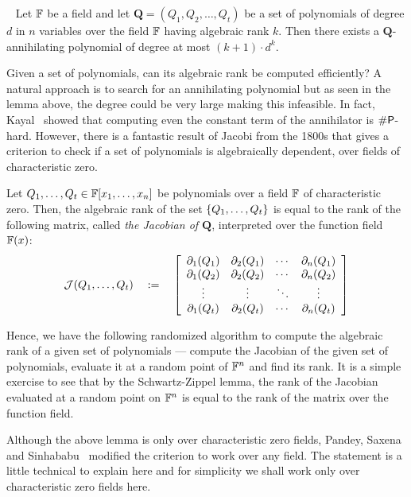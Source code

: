 \begin{lemma}~\label{lem:degree upper bound for annihilating poly}
Let $\F$ be a field and let $\mathbf{Q} = (Q_1, Q_2, \ldots, Q_t)$ be a set of polynomials of degree $d$ in $n$ variables over the field $\F$ having algebraic rank $k$. Then there exists a $\mathbf{Q}$-annihilating polynomial
of degree at most $(k+1)\cdot d^k$.
\end{lemma}  

Given a set of polynomials, can its algebraic rank be computed efficiently? A natural approach is to search for an annihilating polynomial but as seen in the lemma above, the degree could be very large making this infeasible. In fact, Kayal~\cite{Kayal09} showed that computing even the constant term of the annihilator is $\#\P$-hard. However, there is a fantastic result of Jacobi from the 1800s that gives a criterion to check if a set of polynomials is algebraically dependent, over fields of characteristic zero. 

\begin{lemma}\label{lem:jacobian-criterion}
Let $Q_1,\ldots, Q_t \in \F[x_1,\ldots, x_n]$ be polynomials over a field $\F$ of characteristic zero. Then, the algebraic rank of the set $\set{Q_1,\ldots, Q_t}$ is equal to the rank of the following matrix, called \emph{the Jacobian of $\mathbf{Q}$}, interpreted over the function field $\F(x)$:
\[
\mathcal{J}(Q_1,\ldots, Q_t) \spaced{:=} \insquare{\begin{array}{cccc}
\partial_1(Q_1) & \partial_2(Q_1) & \cdots & \partial_n(Q_1)\\
\partial_1(Q_2) & \partial_2(Q_2) & \cdots & \partial_n(Q_2)\\
\vdots & \vdots & \ddots & \vdots\\
\partial_1(Q_t) & \partial_2(Q_t) & \cdots & \partial_n(Q_t)
                                          \end{array}}                                          
\]
\end{lemma}

Hence, we have the following randomized algorithm to compute the algebraic rank of a given set of polynomials --- compute the Jacobian of the given set of polynomials, evaluate it at a random point of $\F^n$ and find its rank.
It is a simple exercise to see that by the Schwartz-Zippel lemma, the rank of the Jacobian evaluated at a random point on $\F^n$ is equal to the rank of the matrix over the function field.

Although the above lemma is only over characteristic zero fields, Pandey, Saxena and Sinhababu~\cite{PSS16} modified the criterion to work over any field. The statement is a little technical to explain here and for simplicity we shall work only over characteristic zero fields here. 
\\

